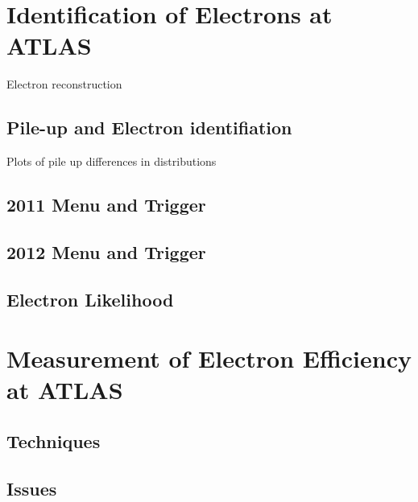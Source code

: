 \section{Identification of Electrons at ATLAS}

Electron reconstruction 


\subsection{Pile-up and Electron identifiation}

Plots of pile up differences in distributions 

\subsection{2011 Menu and Trigger}

\subsection{2012 Menu and Trigger}

\subsection{Electron Likelihood}

\section{Measurement of Electron Efficiency at ATLAS}

\subsection{Techniques}

\subsection{Issues}

